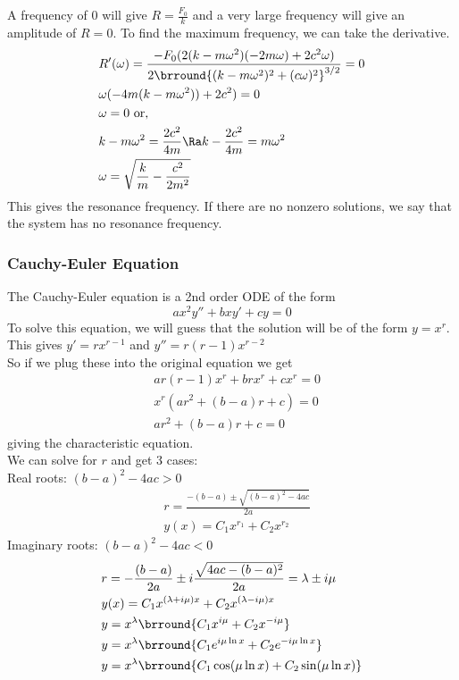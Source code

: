 A frequency of $0$ will give $R=\frac{F_0}{k}$ and a very large frequency will give an amplitude of $R=0$. To find the maximum frequency, we can take the derivative.
\begin{align*}
    &R'(\omega)=\frac{-F_0(2(k-m\omega^2)(-2m\omega)+2c^2\omega)}{2\brround{(k-m\omega^2)^2+(c\omega)^2}^{3/2}}=0\\
    &\omega(-4m(k-m\omega^2))+2c^2)=0\\
    &\omega=0\text{ or,}\\
    &k-m\omega^2=\frac{2c^2}{4m}\Ra k-\frac{2c^2}{4m}=m\omega^2\\
    &\omega=\sqrt{\frac{k}{m}-\frac{c^2}{2m^2}}
\end{align*}
This gives the resonance frequency. If there are no nonzero solutions, we say that the system has no resonance frequency.
\subsubsection{Cauchy-Euler Equation}
The Cauchy-Euler equation is a 2nd order ODE of the form
$$ax^2y''+bxy'+cy=0$$
To solve this equation, we will guess that the solution will be of the form $y=x^r$.\\
This gives $y'=rx^{r-1}$ and $y''=r(r-1)x^{r-2}$\\
So if we plug these into the original equation we get
\begin{align*}
    &ar(r-1)x^r+brx^r+cx^r=0\\
    &x^r(ar^2+(b-a)r+c)=0\\
    &ar^2+(b-a)r+c=0
\end{align*}
giving the characteristic equation.\\
We can solve for $r$ and get 3 cases:\\
Real roots: $(b-a)^2-4ac>0$
\begin{align*}
    &r=\frac{-(b-a)\pm\sqrt{(b-a)^2-4ac}}{2a}\\
    &y(x)=C_1x^{r_1}+C_2x^{r_2}
\end{align*}
Imaginary roots: $(b-a)^2-4ac<0$\\
\begin{align*}
    &r=-\frac{(b-a)}{2a}\pm i\frac{\sqrt{4ac-(b-a)^2}}{2a}=\lambda\pm i\mu\\
    &y(x)=C_1x^{(\lambda+i\mu)x}+C_2x^{(\lambda-i\mu)x}\\
    &y=x^\lambda\brround{C_1x^{i\mu}+C_2x^{-i\mu}}\\
    &y=x^\lambda\brround{C_1e^{i\mu\ln x}+C_2e^{-i\mu\ln x}}\\
    &y=x^\lambda\brround{C_1\cos(\mu\ln x)+C_2\sin(\mu\ln x)}
\end{align*}
